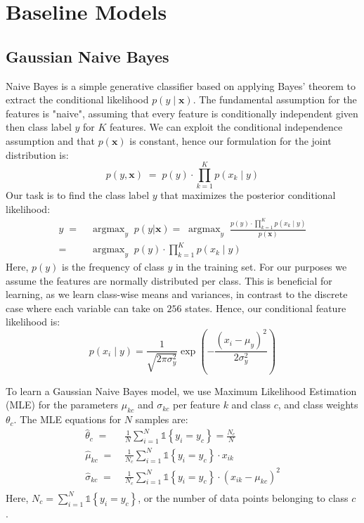 \documentclass{article}
\DeclareMathOperator*{\argmax}{argmax}
\begin{document}
\section{Baseline Models}
\label{sec:baseline-models}
\subsection{Gaussian Naive Bayes}
\label{sec:NB}
Naive Bayes is a simple generative classifier based on applying Bayes' theorem
to extract the conditional likelihood $p(y \mid \mathbf{x})$. The fundamental
assumption for the features is "naive", assuming that every feature
is conditionally independent given then class label $y$ for $K$ features.
We can exploit the conditional independence assumption and that
$p(\mathbf{x})$ is constant, hence our formulation for the joint
distribution is:
\begin{equation}
    p(y, \mathbf{x}) \; = \; p(y) \cdot \prod_{k=1}^K p(x_k \mid y)
\end{equation}
Our task is to find the class label $y$ that maximizes the posterior conditional
likelihood:
\begin{equation}
  \begin{aligned}
    \hat{y} \; = \; & \argmax_y \; p(y | \mathbf{x})
    = \;  \argmax_y \; \frac{p(y) \cdot \prod_{k=1}^K p(x_k \mid y)}{p(\mathbf{x})} \\
    = \; & \argmax_y \; p(y) \cdot \prod_{k=1}^K p(x_k \mid y)
  \end{aligned}
\end{equation}
Here, $p(y)$ is the frequency of class $y$ in the training set.
For our purposes we assume the features are normally distributed per class.
This is beneficial for learning, as we learn class-wise means and variances,
in contrast to the discrete case where each variable can take on $256$ states.
Hence, our conditional feature likelihood is:
\begin{equation}
  p(x_i \mid y) = \frac{1}{\sqrt{2\pi\sigma^2_y}} \exp\left(-\frac{(x_i - \mu_y)^2}{2\sigma^2_y}\right)
\end{equation}

To learn a Gaussian Naive Bayes model, we use Maximum Likelihood Estimation (MLE) for
the parameters $\mu_{kc}$ and $\sigma_{kc}$ per feature $k$ and class $c$, and class weights
$\theta_c$. The MLE equations for $N$ samples are:
\begin{equation}
  \begin{aligned}
    \hat{\theta}_c \; = \; & \frac{1}{N} \sum_{i=1}^N \mathds{1} \left \{ y_i = y_c \right \} = \frac{N_c}{N} \\
    \hat{\mu}_{kc} \; = \; & \frac{1}{N_c} \sum_{i=1}^N \mathds{1} \left \{ y_i = y_c \right \} \cdot x_{ik} \\
    \hat{\sigma}_{kc} \; = \; & \frac{1}{N_c} \sum_{i=1}^N \mathds{1} \left \{ y_i = y_c \right \} \cdot \left( x_{ik} - \mu_{kc} \right)^2 \\
  \end{aligned}
\end{equation}
Here, $N_c = \sum_{i=1}^N \mathds{1} \left \{ y_i = y_c \right \} $, or the number
of data points belonging to class $c$ \cite{murphy}.
\end{document}

